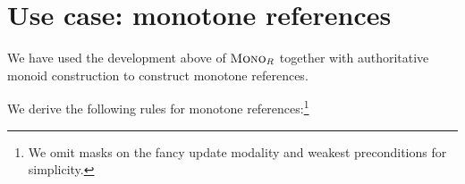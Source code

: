 \documentclass{scrartcl}
\begin{document}
\section{Use case: monotone references}
We have used the development above of $\textsc{Mono}_{R}$ together with
authoritative monoid construction to construct monotone references.

We derive the following rules for monotone references:\footnote{We
  omit masks on the fancy update modality and weakest preconditions
  for simplicity.}
\end{document}
